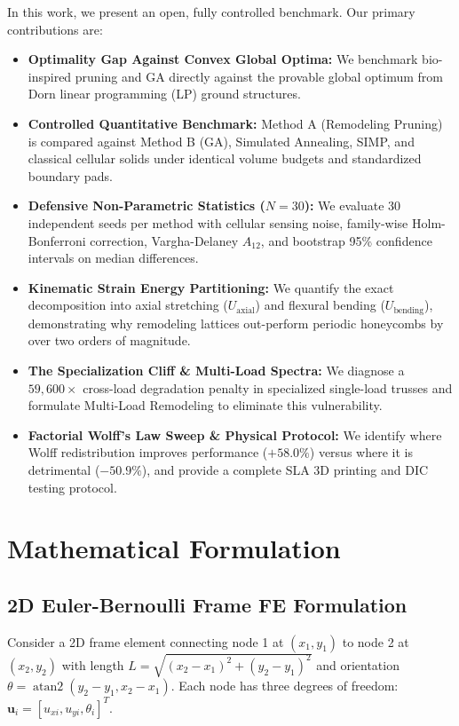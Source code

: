 \documentclass[10pt,journal,compsoc]{IEEEtran}
\begin{document}
In this work, we present an open, fully controlled benchmark. Our primary contributions are:
\begin{itemize}
    \item \textbf{Optimality Gap Against Convex Global Optima:} We benchmark bio-inspired pruning and GA directly against the provable global optimum from Dorn linear programming (LP) ground structures.
    \item \textbf{Controlled Quantitative Benchmark:} Method A (Remodeling Pruning) is compared against Method B (GA), Simulated Annealing, SIMP, and classical cellular solids under identical volume budgets and standardized boundary pads.
    \item \textbf{Defensive Non-Parametric Statistics ($N=30$):} We evaluate 30 independent seeds per method with cellular sensing noise, family-wise Holm-Bonferroni correction, Vargha-Delaney $A_{12}$, and bootstrap 95\% confidence intervals on median differences.
    \item \textbf{Kinematic Strain Energy Partitioning:} We quantify the exact decomposition into axial stretching ($U_{\text{axial}}$) and flexural bending ($U_{\text{bending}}$), demonstrating why remodeling lattices out-perform periodic honeycombs by over two orders of magnitude.
    \item \textbf{The Specialization Cliff \& Multi-Load Spectra:} We diagnose a $59,600\times$ cross-load degradation penalty in specialized single-load trusses and formulate Multi-Load Remodeling to eliminate this vulnerability.
    \item \textbf{Factorial Wolff's Law Sweep \& Physical Protocol:} We identify where Wolff redistribution improves performance ($+58.0\%$) versus where it is detrimental ($-50.9\%$), and provide a complete SLA 3D printing and DIC testing protocol.
\end{itemize}

\section{Mathematical Formulation}

\subsection{2D Euler-Bernoulli Frame FE Formulation}
Consider a 2D frame element connecting node 1 at $(x_1, y_1)$ to node 2 at $(x_2, y_2)$ with length $L = \sqrt{(x_2-x_1)^2 + (y_2-y_1)^2}$ and orientation $\theta = \operatorname{atan2}(y_2-y_1, x_2-x_1)$. Each node has three degrees of freedom: $\mathbf{u}_i = [u_{xi}, u_{yi}, \theta_i]^T$.
\end{document}
